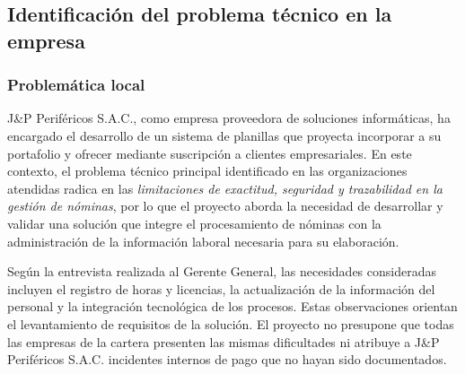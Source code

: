 \subsection{Identificación del problema técnico en la empresa}

\subsubsection{Problemática local}

J\&P Periféricos S.A.C., como empresa proveedora de soluciones informáticas, 
ha encargado el desarrollo de un sistema de planillas que proyecta incorporar a su portafolio y ofrecer mediante suscripción a clientes empresariales. 
En este contexto, el problema técnico principal identificado en las organizaciones atendidas radica en las 
\textit{limitaciones de exactitud, seguridad y trazabilidad en la gestión de nóminas}, 
por lo que el proyecto aborda la necesidad de desarrollar y validar una solución que integre el procesamiento de nóminas con la administración de la información laboral necesaria para su elaboración.

Según la entrevista realizada al Gerente General, las necesidades consideradas incluyen el registro de horas y licencias, 
la actualización de la información del personal y la integración tecnológica de los procesos. Estas observaciones orientan el levantamiento de requisitos de la solución. 
El proyecto no presupone que todas las empresas de la cartera presenten las mismas dificultades ni atribuye a J\&P Periféricos S.A.C. incidentes internos de pago que no hayan sido documentados.

